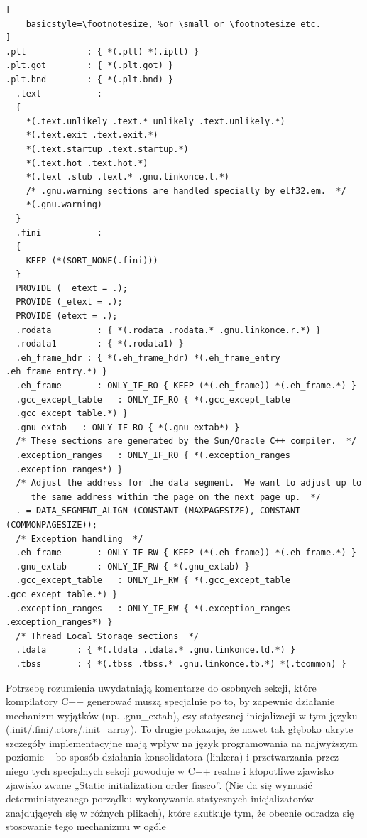 \begin{lstlisting}[
    basicstyle=\footnotesize, %or \small or \footnotesize etc.
]
.plt            : { *(.plt) *(.iplt) }
.plt.got        : { *(.plt.got) }
.plt.bnd        : { *(.plt.bnd) }
  .text           :
  {
    *(.text.unlikely .text.*_unlikely .text.unlikely.*)
    *(.text.exit .text.exit.*)
    *(.text.startup .text.startup.*)
    *(.text.hot .text.hot.*)
    *(.text .stub .text.* .gnu.linkonce.t.*)
    /* .gnu.warning sections are handled specially by elf32.em.  */
    *(.gnu.warning)
  }
  .fini           :
  {
    KEEP (*(SORT_NONE(.fini)))
  }
  PROVIDE (__etext = .);
  PROVIDE (_etext = .);
  PROVIDE (etext = .);
  .rodata         : { *(.rodata .rodata.* .gnu.linkonce.r.*) }
  .rodata1        : { *(.rodata1) }
  .eh_frame_hdr : { *(.eh_frame_hdr) *(.eh_frame_entry .eh_frame_entry.*) }
  .eh_frame       : ONLY_IF_RO { KEEP (*(.eh_frame)) *(.eh_frame.*) }
  .gcc_except_table   : ONLY_IF_RO { *(.gcc_except_table
  .gcc_except_table.*) }
  .gnu_extab   : ONLY_IF_RO { *(.gnu_extab*) }
  /* These sections are generated by the Sun/Oracle C++ compiler.  */
  .exception_ranges   : ONLY_IF_RO { *(.exception_ranges
  .exception_ranges*) }
  /* Adjust the address for the data segment.  We want to adjust up to
     the same address within the page on the next page up.  */
  . = DATA_SEGMENT_ALIGN (CONSTANT (MAXPAGESIZE), CONSTANT (COMMONPAGESIZE));
  /* Exception handling  */
  .eh_frame       : ONLY_IF_RW { KEEP (*(.eh_frame)) *(.eh_frame.*) }
  .gnu_extab      : ONLY_IF_RW { *(.gnu_extab) }
  .gcc_except_table   : ONLY_IF_RW { *(.gcc_except_table .gcc_except_table.*) }
  .exception_ranges   : ONLY_IF_RW { *(.exception_ranges .exception_ranges*) }
  /* Thread Local Storage sections  */
  .tdata	  : { *(.tdata .tdata.* .gnu.linkonce.td.*) }
  .tbss		  : { *(.tbss .tbss.* .gnu.linkonce.tb.*) *(.tcommon) }
\end{lstlisting}

Potrzebę rozumienia uwydatniają komentarze do osobnych sekcji, które kompilatory C++ generować muszą specjalnie po to, by zapewnic działanie mechanizm wyjątków (np. .gnu\_extab), czy statycznej inicjalizacji w tym języku (.init/.fini/.ctors/.init\_array). To drugie pokazuje, że nawet tak głęboko ukryte szczegóły implementacyjne mają wpływ na język programowania na najwyższym poziomie – bo sposób działania konsolidatora (linkera) i przetwarzania przez niego tych specjalnych sekcji powoduje w C++ realne i kłopotliwe zjawisko zjawisko zwane „Static initialization order fiasco”\cite{siof}. (Nie da się wymusić deterministycznego porządku wykonywania statycznych inicjalizatorów znajdujących się w różnych plikach), które skutkuje tym, że obecnie odradza się stosowanie tego mechanizmu w ogóle\cite{google_cpp_guidelines_static}

